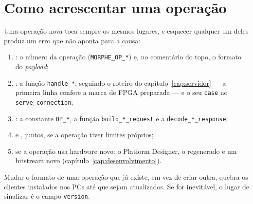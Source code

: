 \section{Como acrescentar uma operação}
\label{sec:novo-opcode}

Uma operação nova toca sempre os mesmos lugares, e esquecer qualquer um deles
produz um erro que não aponta para a causa:

\begin{enumerate}
  \item {}: o número da operação
    (\texttt{MORPHE\_OP\_*}) e, no comentário do topo, o formato do
    \emph{payload};
  \item {}: a função \texttt{handle\_*}, seguindo o roteiro
    do capítulo~\ref{cap:servidor} --- a primeira linha confere a marca de FPGA
    preparada --- e o seu \texttt{case} no \texttt{serve\_connection};
  \item {}: a constante \texttt{OP\_*}, a função
    \texttt{build\_*\_request} e a \texttt{decode\_*\_response};
  \item {} e , juntos, se a
    operação tiver limites próprios;
  \item se a operação usa hardware novo: o Platform Designer, o 
    regenerado e um bitstream novo (capítulo~\ref{cap:desenvolvimento}).
\end{enumerate}

Mudar o formato de uma operação que já existe, em vez de criar outra, quebra os
clientes instalados nos PCs até que sejam atualizados. Se for inevitável, o
lugar de sinalizar é o campo \texttt{version}.

